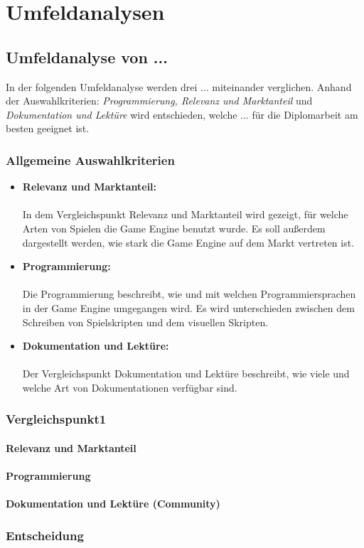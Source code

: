 \chapter{Umfeldanalysen}
\section{Umfeldanalyse von ...}
In der folgenden Umfeldanalyse werden drei ... miteinander verglichen. Anhand der Auswahlkriterien: \textit{Programmierung, Relevanz und Marktanteil} und \textit{Dokumentation und Lektüre} wird entschieden, welche ... für die Diplomarbeit am besten geeignet ist.

\subsection{Allgemeine Auswahlkriterien}
\begin{itemize}
  \item \textbf{Relevanz und Marktanteil:}\\\\ In dem Vergleichspunkt Relevanz und Marktanteil wird gezeigt, für welche Arten von Spielen die Game Engine benutzt wurde. Es soll außerdem dargestellt werden, wie stark die Game Engine auf dem Markt vertreten ist.
  \item \textbf{Programmierung:}\\\\ Die Programmierung beschreibt, wie und mit welchen Programmiersprachen in der Game Engine umgegangen wird. Es wird unterschieden zwischen dem Schreiben von Spielskripten und dem visuellen Skripten.
  \item \textbf{Dokumentation und Lektüre:}\\\\ Der Vergleichspunkt Dokumentation und Lektüre beschreibt, wie viele und welche Art von Dokumentationen verfügbar sind. 
\end{itemize}

\pagebreak

\subsection{Vergleichspunkt1}
\subsubsection{Relevanz und Marktanteil}

\subsubsection{Programmierung}

\subsubsection{Dokumentation und Lektüre (Community)}

\subsection{Entscheidung}

\pagebreak